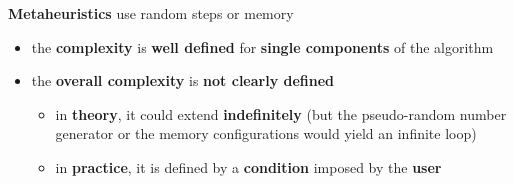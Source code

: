 \textbf{Metaheuristics} use random steps or memory
\begin{itemize}
	\item the \textbf{complexity} is \textbf{well defined} for \textbf{single components} of the algorithm
	\item the \textbf{overall complexity} is \textbf{not clearly defined}
	\begin{itemize}
		\item in \textbf{theory}, it could extend \textbf{indefinitely} (but the pseudo-random number generator or the memory configurations would yield an infinite loop)
		\item in \textbf{practice}, it is defined by a \textbf{condition} imposed by the \textbf{user} 
	\end{itemize}
\end{itemize}


\newpage